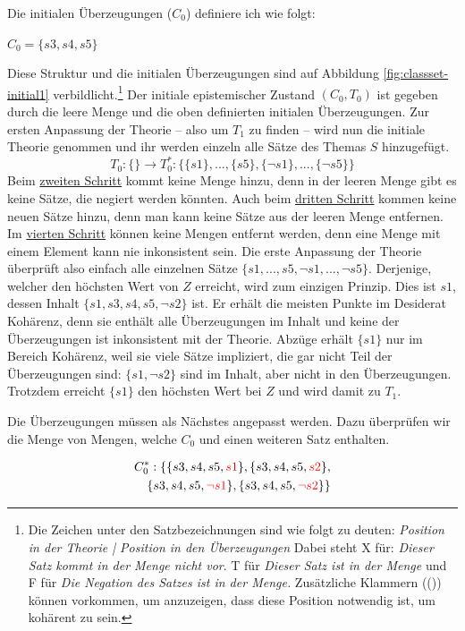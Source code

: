 \documentclass{article}
\begin{document}
 Die initialen Überzeugungen ($C_0$) definiere ich wie folgt:
 
 $C_0 = \{s3, s4, s5\}$
 
 Diese Struktur und die initialen Überzeugungen sind auf Abbildung \ref{fig:classset-initial1} verbildlicht.\footnote{Die Zeichen unter den Satzbezeichnungen sind wie folgt zu deuten: \textit{Position in der Theorie | Position in den Überzeugungen} Dabei steht X für: \textit{Dieser Satz kommt in der Menge nicht vor}. T für \textit{Dieser Satz ist in der Menge} und F für \textit{Die Negation des Satzes ist in der Menge.} Zusätzliche Klammern (()) können vorkommen, um anzuzeigen, dass diese Position notwendig ist, um kohärent zu sein.}
 Der initiale epistemischer Zustand $(C_0, T_0)$ ist gegeben durch die leere Menge und die oben definierten initialen Überzeugungen. Zur ersten Anpassung der Theorie -- also um $T_1$ zu finden -- wird nun die initiale Theorie genommen und ihr werden einzeln alle Sätze des Themas $S$ hinzugefügt.
 $$
 T_0: \{\} \longrightarrow T_0^*: \{\{s1\},...,\{s5\}, \{\neg s1\}, ..., \{\neg s5\}\}
 $$
 Beim \hyperref[1.1]{zweiten Schritt} kommt keine Menge hinzu, denn in der leeren Menge gibt es keine Sätze, die negiert werden könnten. Auch beim \hyperref[2]{dritten Schritt} kommen keine neuen Sätze hinzu, denn man kann keine Sätze aus der leeren Menge entfernen. Im \hyperref[konsistenzfilter]{vierten Schritt} können keine Mengen entfernt werden, denn eine Menge mit einem Element kann nie inkonsistent sein. Die erste Anpassung der Theorie überprüft also einfach alle einzelnen Sätze $\{s1,...,s5, \neg s1, ..., \neg s5\}$. Derjenige, welcher den höchsten Wert von $Z$ erreicht, wird zum einzigen Prinzip. Dies ist $s1$, dessen Inhalt $\{s1,s3,s4,s5,\neg s2\}$ ist. Er erhält die meisten Punkte im Desiderat Kohärenz, denn sie enthält alle Überzeugungen im Inhalt und keine der Überzeugungen ist inkonsistent mit der Theorie. Abzüge erhält $\{s1\}$ nur im Bereich Kohärenz, weil sie viele Sätze impliziert, die gar nicht Teil der Überzeugungen sind: $\{s1, \neg s2\}$ sind im Inhalt, aber nicht in den Überzeugungen. Trotzdem erreicht $\{s1\}$ den höchsten Wert bei $Z$ und wird damit zu $T_1$.
 
 Die Überzeugungen müssen als Nächstes angepasst werden. Dazu überprüfen wir die Menge von Mengen, welche $C_0$ und einen weiteren Satz enthalten.
 
 \begin{equation} \notag
 \begin{split}
 C_0^*: \{\{s3, s4, s5, \textcolor{red}{s1}\}, \{s3, s4, s5, \textcolor{red}{s2}\}, \\
 \{s3, s4, s5, \textcolor{red}{\neg s1}\}, \{s3, s4, s5, \textcolor{red}{\neg s2}\}\}
 \end{split}
 \end{equation}
 
\end{document}
